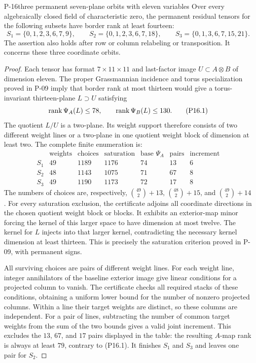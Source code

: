 \begin{finding}{P-16}{three permanent seven-plane orbits with eleven variables}
Over every algebraically closed field of characteristic zero, the
permanent residual tensors for the following subsets have border rank
at least fourteen:
\[
 S_1=\{0,1,2,3,6,7,9\},\qquad
 S_2=\{0,1,2,3,6,7,18\},\qquad
 S_3=\{0,1,3,6,7,15,21\}.
\]
The assertion also holds after row or column relabeling or transposition.
It concerns these three coordinate orbits.
\end{finding}
\begin{proof}
Each tensor has format $7\times11\times11$ and last-factor image
$U\subset A\otimes B$ of dimension eleven. The proper Grassmannian
incidence and torus specialization proved in P-09 imply that border
rank at most thirteen would give a torus-invariant thirteen-plane
$L\supset U$ satisfying
\[
 \operatorname{rank}\Psi_A(L)\le78,\qquad \operatorname{rank}\Psi_B(L)\le130.
 \tag{P16.1}
\]
The quotient $L/U$ is a two-plane. Its weight support therefore consists
of two different weight lines or a two-plane in one quotient weight
block of dimension at least two. The complete finite enumeration is:
\[
\begin{array}{c|r|r|r|r|r|r}
 &\text{weights}&\text{choices}&\text{saturation}
 &\text{base }\Psi_A&\text{pairs}&\text{increment}\\\hline
 S_1&49&1189&1176&74&13&6\\
 S_2&48&1143&1075&71&67&8\\
 S_3&49&1190&1173&72&17&8
\end{array}
\]
The numbers of choices are, respectively,
$\binom{49}{2}+13$, $\binom{48}{2}+15$, and
$\binom{49}{2}+14$. For every saturation exclusion, the certificate
adjoins all coordinate directions in the chosen quotient weight block
or blocks. It exhibits an exterior-map minor forcing the kernel of
this larger space to have dimension at most twelve. The kernel for
$L$ injects into that larger kernel, contradicting the necessary
kernel dimension at least thirteen. This is precisely the saturation
criterion proved in P-09, with permanent signs.

All surviving choices are pairs of different weight lines. For each
weight line, integer annihilators of the baseline exterior image give
linear conditions for a projected column to vanish. The certificate
checks all required stacks of these conditions, obtaining a uniform
lower bound for the number of nonzero projected columns. Within a line
their target weights are distinct, so these columns are independent.
For a pair of lines, subtracting the number of common target weights
from the sum of the two bounds gives a valid joint increment. This
excludes the $13$, $67$, and $17$ pairs displayed in the table: the
resulting $A$-map rank is always at least $79$, contrary to (P16.1).
It finishes $S_1$ and $S_3$ and leaves one pair for $S_2$.


\end{proof}
